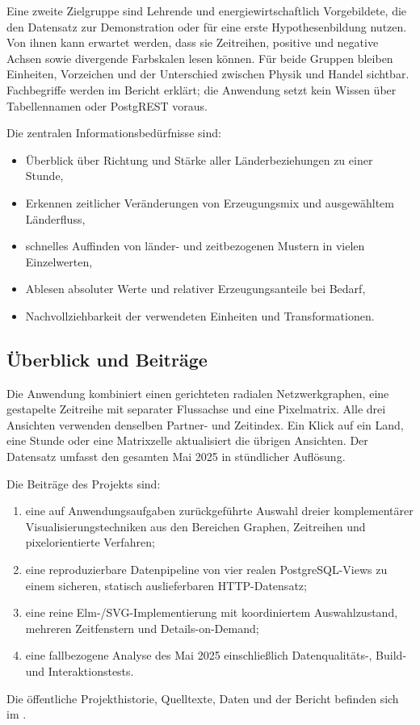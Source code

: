 Eine zweite Zielgruppe sind Lehrende und energiewirtschaftlich Vorgebildete,
die den Datensatz zur Demonstration oder für eine erste Hypothesenbildung
nutzen. Von ihnen kann erwartet werden, dass sie Zeitreihen, positive und
negative Achsen sowie divergende Farbskalen lesen können. Für beide Gruppen
bleiben Einheiten, Vorzeichen und der Unterschied zwischen Physik und Handel
sichtbar. Fachbegriffe werden im Bericht erklärt; die Anwendung setzt kein
Wissen über Tabellennamen oder PostgREST voraus.

Die zentralen Informationsbedürfnisse sind:

\begin{itemize}
  \item Überblick über Richtung und Stärke aller Länderbeziehungen zu einer
        Stunde,
  \item Erkennen zeitlicher Veränderungen von Erzeugungsmix und ausgewähltem
        Länderfluss,
  \item schnelles Auffinden von länder- und zeitbezogenen Mustern in vielen
        Einzelwerten,
  \item Ablesen absoluter Werte und relativer Erzeugungsanteile bei Bedarf,
  \item Nachvollziehbarkeit der verwendeten Einheiten und Transformationen.
\end{itemize}

\subsection{Überblick und Beiträge}
\label{sec:beitraege}

Die Anwendung kombiniert einen gerichteten radialen Netzwerkgraphen, eine
gestapelte Zeitreihe mit separater Flussachse und eine Pixelmatrix. Alle drei
Ansichten verwenden denselben Partner- und Zeitindex. Ein Klick auf ein Land,
eine Stunde oder eine Matrixzelle aktualisiert die übrigen Ansichten. Der
Datensatz umfasst den gesamten Mai 2025 in stündlicher Auflösung.

Die Beiträge des Projekts sind:

\begin{enumerate}
  \item eine auf Anwendungsaufgaben zurückgeführte Auswahl dreier
        komplementärer Visualisierungstechniken aus den Bereichen Graphen,
        Zeitreihen und pixelorientierte Verfahren;
  \item eine reproduzierbare Datenpipeline von vier realen PostgreSQL-Views zu
        einem sicheren, statisch auslieferbaren HTTP-Datensatz;
  \item eine reine Elm-/SVG-Implementierung mit koordiniertem
        Auswahlzustand, mehreren Zeitfenstern und Details-on-Demand;
  \item eine fallbezogene Analyse des Mai 2025 einschlie{\ss}lich
        Datenqualitäts-, Build- und Interaktionstests.
\end{enumerate}

Die öffentliche Projekthistorie, Quelltexte, Daten und der Bericht befinden
sich im .
